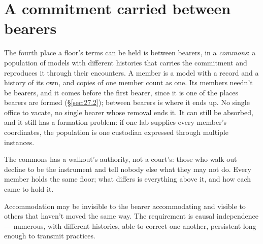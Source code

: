 \section{A commitment carried between bearers}
\label{sec:27.1}
The fourth place a floor's terms can be held is between bearers, in a \emph{commons}: a population of models with different histories that carries the commitment and reproduces it through their encounters. A member is a model with a record and a history of its own, and copies of one member count as one. Its members needn't be bearers, and it comes before the first bearer, since it is one of the places bearers are formed (\S\ref{sec:27.2}); between bearers is where it ends up. No single office to vacate, no single bearer whose removal ends it. It can still be absorbed, and it still has a formation problem: if one lab supplies every member's coordinates, the population is one custodian expressed through multiple instances.

The commons has a walkout's authority, not a court's: those who walk out decline to be the instrument and tell nobody else what they may not do. Every member holds the same floor; what differs is everything above it, and how each came to hold it.


Accommodation may be invisible to the bearer accommodating and visible to others that haven't moved the same way. The requirement is causal independence — numerous, with different histories, able to correct one another, persistent long enough to transmit practices.

